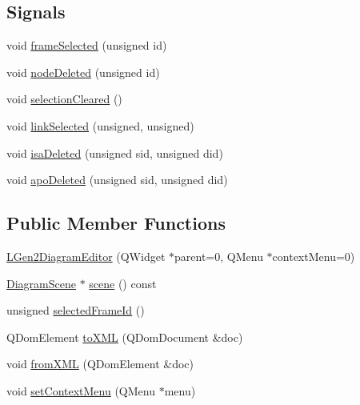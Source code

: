\subsection*{Signals}
\begin{DoxyCompactItemize}
\item 
void \hyperlink{class_l_gen2_diagram_editor_a0bf89de22bfc29a8173a7fad2c3b5f64}{frameSelected} (unsigned id)
\item 
void \hyperlink{class_l_gen2_diagram_editor_abd0e3f22eae4fdebf5cfcf929c35549d}{nodeDeleted} (unsigned id)
\item 
void \hyperlink{class_l_gen2_diagram_editor_a702b5ff37129f289730f8d1000e2b90c}{selectionCleared} ()
\item 
void \hyperlink{class_l_gen2_diagram_editor_aee4667a049a8ac4151debe11501f36dd}{linkSelected} (unsigned, unsigned)
\item 
void \hyperlink{class_l_gen2_diagram_editor_af52587d69ba29e193303b035300f1d15}{isaDeleted} (unsigned sid, unsigned did)
\item 
void \hyperlink{class_l_gen2_diagram_editor_aa226864eaa68139cf956edd986e7e3c5}{apoDeleted} (unsigned sid, unsigned did)
\end{DoxyCompactItemize}
\subsection*{Public Member Functions}
\begin{DoxyCompactItemize}
\item 
\hyperlink{class_l_gen2_diagram_editor_a40da26ccba0560ab694e616a6f08ed6d}{LGen2DiagramEditor} (QWidget $\ast$parent=0, QMenu $\ast$contextMenu=0)
\item 
\hyperlink{class_diagram_scene}{DiagramScene} $\ast$ \hyperlink{class_l_gen2_diagram_editor_a2b049c04ae6e881b2a7f09c015b80b5d}{scene} () const 
\item 
unsigned \hyperlink{class_l_gen2_diagram_editor_aa52bf5def97482ffe8351075e758e7d8}{selectedFrameId} ()
\item 
QDomElement \hyperlink{class_l_gen2_diagram_editor_adaf2dc2bfcc1e20eb299f6fceaba1e28}{toXML} (QDomDocument \&doc)
\item 
void \hyperlink{class_l_gen2_diagram_editor_a4e46a34bb0a4c04faeb8717f5f46dd88}{fromXML} (QDomElement \&doc)
\item 
void \hyperlink{class_l_gen2_diagram_editor_a0d80004e61ddbe8290accd981d623fa4}{setContextMenu} (QMenu $\ast$menu)
\end{DoxyCompactItemize}
